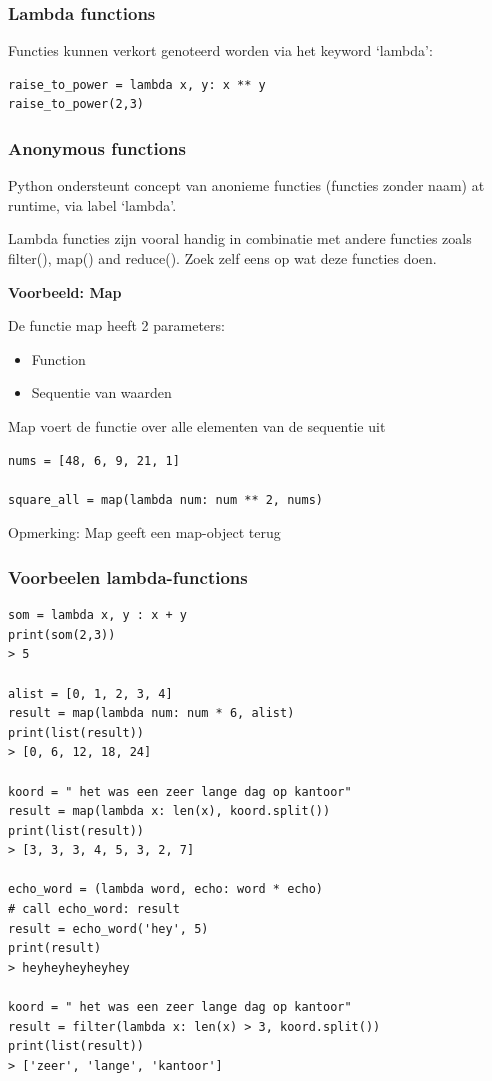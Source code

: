 \documentclass{article}
\begin{document}
\subsubsection{Lambda functions}

Functies kunnen verkort genoteerd worden via het keyword `lambda':

\begin{verbatim}
raise_to_power = lambda x, y: x ** y
raise_to_power(2,3)
\end{verbatim}

\subsubsection{Anonymous functions}

Python ondersteunt concept van anonieme functies (functies zonder
naam) at runtime, via label `lambda'.

Lambda functies zijn vooral handig in combinatie met andere functies
zoals filter(), map() and reduce(). Zoek zelf eens op wat deze functies doen.

\textbf{Voorbeeld: Map}

De functie map heeft 2 parameters:

\begin{itemize}
    \item Function
    \item Sequentie van waarden
\end{itemize}

Map voert de functie over alle elementen van de sequentie uit

\begin{verbatim}
nums = [48, 6, 9, 21, 1]

square_all = map(lambda num: num ** 2, nums)
\end{verbatim}

Opmerking: Map geeft een map-object terug

\subsubsection{Voorbeelen lambda-functions}

\begin{verbatim}
som = lambda x, y : x + y
print(som(2,3))
> 5

alist = [0, 1, 2, 3, 4]
result = map(lambda num: num * 6, alist)
print(list(result))
> [0, 6, 12, 18, 24]

koord = " het was een zeer lange dag op kantoor"
result = map(lambda x: len(x), koord.split())
print(list(result))
> [3, 3, 3, 4, 5, 3, 2, 7]

echo_word = (lambda word, echo: word * echo)
# call echo_word: result
result = echo_word('hey', 5)
print(result)
> heyheyheyheyhey

koord = " het was een zeer lange dag op kantoor"
result = filter(lambda x: len(x) > 3, koord.split())
print(list(result))
> ['zeer', 'lange', 'kantoor']
\end{verbatim}
\end{document}

